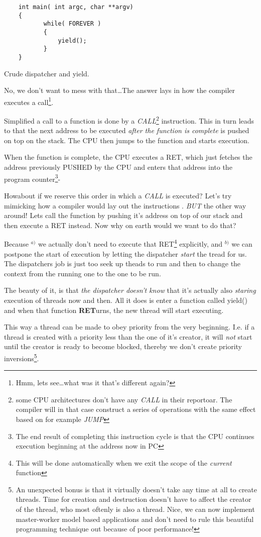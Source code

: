 {\begin{table}[!hbp]
\begin{verbatim}
	int main( int argc, char **argv)
	{
	       while( FOREVER )
	       {
	           yield();
	       }
	}
	\end{verbatim}
	\caption{Crude dispatcher and yield.\label{hp2}}
	\end{table}

		No, we don't want to mess with that\ldots The answer lays in how the compiler executes a call\footnote{Hmm, lets see\ldots what was it that's different again?}. 

		Simplified a call to a function is done by a \textit{CALL}\footnote{some CPU architectures don't have any \textit{CALL} in their reportoar. The compiler will in that case construct a series of operations with the same effect based on for example \textit{JUMP}} instruction. This in turn leads to that the next address to be executed \textit{after the function is complete} is pushed on top on the stack. The CPU then jumps to the function and starts execution. 

		When the function is complete, the CPU executes a RET, which just fetches the address previously PUSHED by the CPU and enters that address into the program counter\footnote{The end result of completing this instruction cycle is that the CPU continues execution beginning at the address now in PC}-

		Howabout if we reserve this order in which a \textit{CALL} is executed? Let's try mimicking how a compiler would lay out the instructions . \textit{BUT} the other way around! Lets call the function by pushing it's address on top of our stack and then execute a RET instead. Now why on earth would we want to do that? 		

		Because $^{a)}$ we actually don't need to execute that RET\footnote{This will be done automatically when we exit the scope of the \textit{current} function} explicitly, and $^{b)}$ we can postpone the start of execution by letting the dispatcher \textit{start} the tread for us. The dispatchers job is just too seek up theads to run and then to change the context from the running one to the one to be run. 

		The beauty of it, is that \textit{the dispatcher doesn't know} that it's actually also \textit{staring} execution of threads now and then. All it does is enter a function called yield() and when that function \textbf{\textit{}RET}urns, the new thread will start executing. 

		This way a thread can be made to obey priority from the very beginning. I.e. if a thread is created with a priority less than the one of it's creator, it will \textit{not} start until the creator is ready to become blocked, thereby we don't create priority inversions\footnote{An unexpected bonus is that it virtually doesn't take any time at all to create threads. Time for creation and destruction doesn't have to affect the creator of the thread, who most oftenly is also a thread. Nice, we can now implement master-worker model based applications and don't need to rule this beautiful programming technique out because of poor performance!}. 

}
